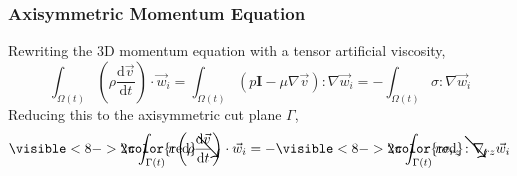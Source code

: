 \documentclass[notes=hide,8pt,xcolor=svgnames]{beamer}
\begin{document}
\begin{frame}
\frametitle{Axisymmetric Momentum Equation}
\begin{minipage}[t][0.35\textheight]{\textwidth}
Rewriting the 3D momentum equation with a tensor artificial viscosity,
\[
\int_{\Omega(t)} \left(\rho\dfrac{\mathrm{d}\vec{v}}{\mathrm{d}t}\right)\cdot
\vec{w}_i
 =\int_{\Omega(t)} (p\mathbf{I}-\mu\nabla\vec{v}) :\nabla\vec{w}_i
 =-\int_{\Omega(t)} \sigma :\nabla\vec{w}_i
\]
Reducing this to the axisymmetric cut plane $\Gamma$,
\[
\visible<8->{\rlap{\color{red}\LARGE{$\searrow$}}}2\pi\int_{\Gamma(t)}r
\left(\rho\dfrac{\mathrm{d}\vec{v}}{\mathrm{d}t}\right)\cdot \vec{w}_i
=-\visible<8->{\rlap{\color{red}\LARGE{$\searrow$}}}2\pi\int_{\Gamma(t)}
r\sigma_{rz} :\nabla_{rz}\vec{w}_i
\]
\end{minipage}
\begin{overlayarea}{\textwidth}{1.0\textwidth}
\only<1-7>{
\vskip-4ex
\begin{block}{}
Applying the cylindrical gradient operator
$\nabla_{rz}f =
\frac{\partial f}{\partial r} \vec e_r +
\frac{1}{r} \frac{\partial f}{\partial \theta} \vec e_\theta +
\frac{\partial f}{\partial z} \vec e_z $


\end{block}}
\end{overlayarea}
\end{frame}
\end{document}
